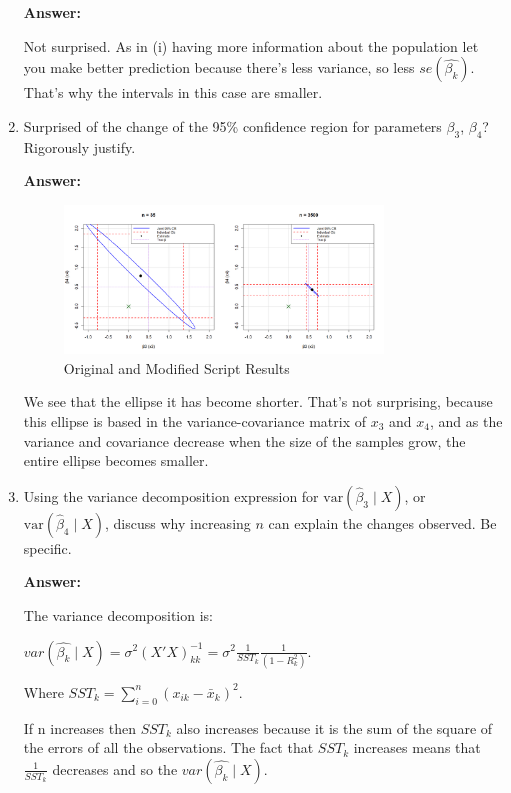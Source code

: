 \documentclass[12pt,a4paper]{article}
\begin{document}
\begin{enumerate}[label=(\roman*)]
  \textbf{Answer:}

  Not surprised. As in (i) having more information about the population let you make better prediction because there's less variance, so less $se(\hat{\beta_k})$. That's why the intervals in this case are smaller.
  
  
  \item Surprised of the change of the 95\% confidence region for parameters $\beta_3$, $\beta_4$? Rigorously justify.
  
  \textbf{Answer:} 

    \begin{figure}[H]  
      \centering
      \includegraphics[width=0.8\textwidth]{Files/elipse_comparison.png}
      \caption{Original and Modified Script Results}
      \label{fig:ellipse}
    \end{figure}

  We see that the ellipse it has become shorter. That's not surprising, because this ellipse is based in the variance-covariance matrix of $x_3$ and $x_4$, and as the variance and covariance decrease when the size of the samples grow, the entire ellipse becomes smaller. 
  
  \item Using the variance decomposition expression for $\text{var}(\hat{\beta}_3 \mid X)$, or $\text{var}(\hat{\beta}_4 \mid X)$, discuss why increasing $n$ can explain the changes observed. Be specific.
  
  \textbf{Answer:} 

The variance decomposition is:
\begin{center}
    
$var(\hat{\beta_k}\mid X) = \sigma^2(X'X)^{-1}_{kk}= \sigma^2 \frac{1}{SST_k} \frac{1}{(1-R_k^2)}$.
\end{center}

Where $SST_k = \sum^n_{i=0}(x_{ik}-\bar{x}_k)^2$. 

If n increases then $SST_k$ also increases because it is the sum of the square of the errors of all the observations. The fact that $SST_k$ increases means that $\frac{1}{SST_k}$ decreases and so the $var(\hat{\beta_k}\mid X)$. 


\end{enumerate}
\end{document}
